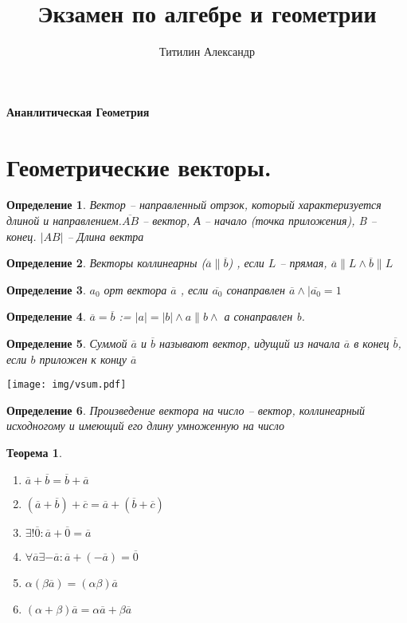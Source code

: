 \documentclass{scrartcl}
\title{Экзамен по алгебре и геометрии}
\author{Титилин Александр}
\date{}
\newtheorem{theorem}{Теорема}
\newtheorem{definition}{Определение}
\begin{document}
    \maketitle
    \paragraph{Ананлитическая Геометрия}
    \section{Геометрические векторы.}
    \begin{definition}
        Вектор -- направленный отрзок, который характеризуется длиной и направлением.$\overline{AB}$ -- вектор, А -- начало (точка приложения),
        B -- конец.
        $|AB|$ -- Длина вектра
    \end{definition}
    \begin{definition}
       Векторы коллинеарны ($\overline{a} \parallel \overline{b}$) , если $L$ -- прямая,  $\overline{a} \parallel L \land \overline{b} \parallel L$
    \end{definition}
    \begin{definition}
        $a_0$ орт вектора $\overline{a}$ , если $\overline{a_0}$ сонаправлен $\overline{a} \land |\overline{a_0} = 1$
    \end{definition}
    \begin{definition}
        $\overline{a} = \overline{b}$ := $|a| = |b| \land a\parallel b \land$ а сонаправлен b.
    \end{definition}
    \begin{definition}
        Суммой $\overline{a}$ и $\overline{b}$ называют вектор, идущий из начала $\overline{a}$ в конец $\overline{b}$, если $b$ приложен к концу  $\overline{a}$
    \end{definition}
    \texttt{[image: img/vsum.pdf]}
    \begin{definition}
        Произведение вектора на число -- вектор, коллинеарный исходногому и имеющий его длину умноженную на число
    \end{definition}
    \begin{theorem}
       \begin{enumerate}
           \item $\overline{a} + \overline{b} = \overline{b} + \overline{a}$
                \item
                    $(\overline{a} + \overline{b}) + \overline{c} = \overline{a} + (\overline{b} + \overline{c})$
                 \item
                     $\exists!  \overline{0}: \overline{a} + \overline{0} = \overline{a}$
                 \item $\forall \overline{a} \exists  -\overline{a} : \overline{a}
                     + (-\overline{a}) = \overline{0}$
                \item $\alpha(\beta \overline{a}) = ( \alpha\beta ) \overline{a}$
                \item $( \alpha + \beta ) \overline{a} = \alpha \overline{a} + \beta \overline{a}$
       \end{enumerate} 
    \end{theorem}
\end{document}
